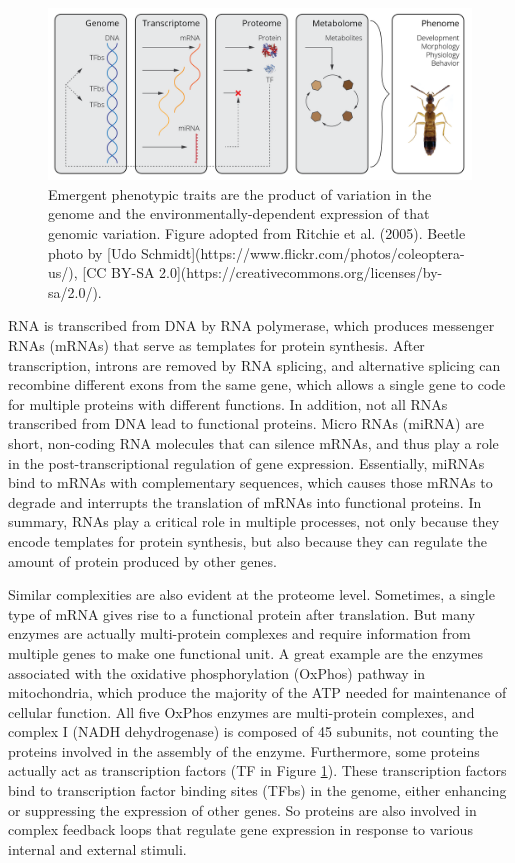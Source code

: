 \documentclass[
]{book}
\begin{document}
\begin{figure}
\includegraphics[width=1\linewidth]{images/g2p} \caption{Emergent phenotypic traits are the product of variation in the genome and the environmentally-dependent expression of that genomic variation. Figure adopted from Ritchie et al. (2005). Beetle photo by [Udo Schmidt](https://www.flickr.com/photos/coleoptera-us/), [CC BY-SA 2.0](https://creativecommons.org/licenses/by-sa/2.0/).}\label{fig:g2p}
\end{figure}

RNA is transcribed from DNA by RNA polymerase, which produces messenger RNAs (mRNAs) that serve as templates for protein synthesis. After transcription, introns are removed by RNA splicing, and alternative splicing can recombine different exons from the same gene, which allows a single gene to code for multiple proteins with different functions. In addition, not all RNAs transcribed from DNA lead to functional proteins. Micro RNAs (miRNA) are short, non-coding RNA molecules that can silence mRNAs, and thus play a role in the post-transcriptional regulation of gene expression. Essentially, miRNAs bind to mRNAs with complementary sequences, which causes those mRNAs to degrade and interrupts the translation of mRNAs into functional proteins. In summary, RNAs play a critical role in multiple processes, not only because they encode templates for protein synthesis, but also because they can regulate the amount of protein produced by other genes.

Similar complexities are also evident at the proteome level. Sometimes, a single type of mRNA gives rise to a functional protein after translation. But many enzymes are actually multi-protein complexes and require information from multiple genes to make one functional unit. A great example are the enzymes associated with the oxidative phosphorylation (OxPhos) pathway in mitochondria, which produce the majority of the ATP needed for maintenance of cellular function. All five OxPhos enzymes are multi-protein complexes, and complex I (NADH dehydrogenase) is composed of 45 subunits, not counting the proteins involved in the assembly of the enzyme. Furthermore, some proteins actually act as transcription factors (TF in Figure \ref{fig:g2p}). These transcription factors bind to transcription factor binding sites (TFbs) in the genome, either enhancing or suppressing the expression of other genes. So proteins are also involved in complex feedback loops that regulate gene expression in response to various internal and external stimuli.
\end{document}
